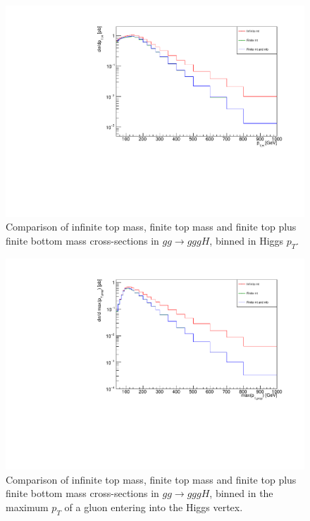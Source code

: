 \begin{figure}[t]
\centering
\includegraphics[scale=0.72]{Images/ptH_3j.pdf}
\caption{Comparison of infinite top mass, finite top mass and finite top plus finite bottom mass cross-sections in $gg \to gggH$, binned in Higgs $p_T$. }
\label{fig:pth_gg_gggH}
\end{figure}

\begin{figure}[H]
\centering
\includegraphics[scale=0.72]{Images/largestproppt.pdf}
\caption{Comparison of infinite top mass, finite top mass and finite top plus finite bottom mass cross-sections in $gg \to gggH$, binned in the maximum $p_T$ of a gluon entering into the Higgs vertex. }
\label{fig:maxprop}
\end{figure}

